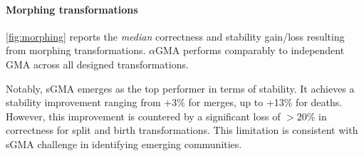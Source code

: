 \documentclass[letterpaper]{article}
\begin{document}
\paragraph*{Morphing transformations}

\cref{fig:morphing} reports the \emph{median} correctness and stability gain/loss resulting from morphing transformations. $\alpha$GMA performs comparably to independent GMA across all designed transformations.

Notably, sGMA emerges as the top performer in terms of stability. It achieves a stability improvement ranging from +3\% for merges, up to +13\% for deaths. However, this improvement is countered by a significant loss of $>20\%$ in correctness for split and birth transformations. This limitation is consistent with sGMA challenge in identifying emerging communities.
\end{document}

